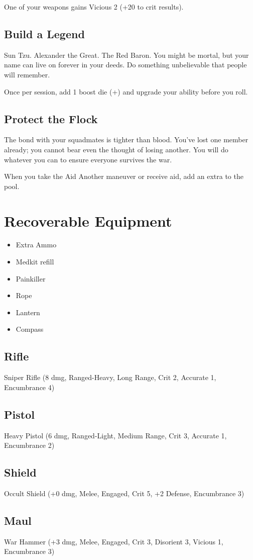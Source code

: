 \documentclass{book}
\newcommand{\bbb}{\BoostDie }
\begin{document}
\begin{multicols}{2}
One of your weapons gains Vicious 2 (+20 to crit results).

\subsection{Build a Legend}

Sun Tzu.  Alexander the Great.  The Red Baron.  You might be mortal, but your name can live on forever in your deeds.  Do something unbelievable that people will remember.

Once per session, add 1 boost die (+\bbb) and upgrade your ability before you roll.

\subsection{Protect the Flock}

The bond with your squadmates is tighter than blood.  You've lost one member already; you cannot bear even the thought of losing another.  You will do whatever you can to ensure everyone survives the war.

When you take the Aid Another maneuver or receive aid, add an extra \Advantage\Advantage to the pool.

\section{Recoverable Equipment}

\begin{itemize}
    \item Extra Ammo
    \item Medkit refill
    \item Painkiller
    \item Rope
    \item Lantern
    \item Compass
\end{itemize}

\subsection{Rifle}

Sniper Rifle (8 dmg, Ranged-Heavy, Long Range, Crit 2, Accurate 1, Encumbrance 4)

\subsection{Pistol}

Heavy Pistol (6 dmg, Ranged-Light, Medium Range, Crit 3, Accurate 1, Encumbrance 2)

\subsection{Shield}

Occult Shield (+0 dmg, Melee, Engaged, Crit 5, +2 Defense, Encumbrance 3)

\subsection{Maul}

War Hammer (+3 dmg, Melee, Engaged, Crit 3, Disorient 3, Vicious 1, Encumbrance 3)



\end{multicols}
\end{document}

